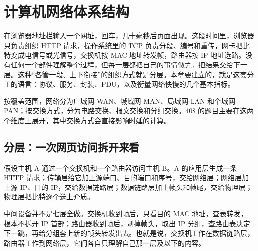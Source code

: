 \section{计算机网络体系结构}

在浏览器地址栏输入一个网址，回车，几十毫秒后页面出现。这段时间里，浏览器只负责组织 HTTP 请求，操作系统里的 TCP 负责分段、编号和重传，网卡把比特变成电信号或光信号，交换机按 MAC 地址转发帧，路由器按 IP 地址选路。没有任何一个部件理解整个过程，但每一层都把自己的事情做完，把结果交给下一层。这种“各管一段、上下衔接”的组织方式就是分层。本章要建立的，就是这套分工的语言：协议、服务、封装、PDU，以及衡量网络快慢的几个基本指标。

按覆盖范围，网络分为广域网 WAN、城域网 MAN、局域网 LAN 和个域网 PAN；按交换方式，分为电路交换、报文交换和分组交换。408 的题目主要在这两个维度上展开，其中交换方式会直接影响时延的计算。

\subsection{分层：一次网页访问拆开来看}

假设主机 A 通过一个交换机和一个路由器访问主机 B。A 的应用层生成一条 HTTP 请求；传输层给它加上源端口、目的端口和序号，交给网络层；网络层加上源 IP、目的 IP，交给数据链路层；数据链路层加上帧头和帧尾，交给物理层；物理层把比特逐个送上介质。

中间设备并不是七层全做。交换机收到帧后，只看目的 MAC 地址，查表转发，根本不拆开 IP 首部；路由器收到帧后，剥掉帧头，取出 IP 分组，查路由表决定下一跳，再给分组套上新的帧头转发出去。也就是说，交换机工作在数据链路层，路由器工作到网络层，它们各自只理解自己那一层及以下的内容。

